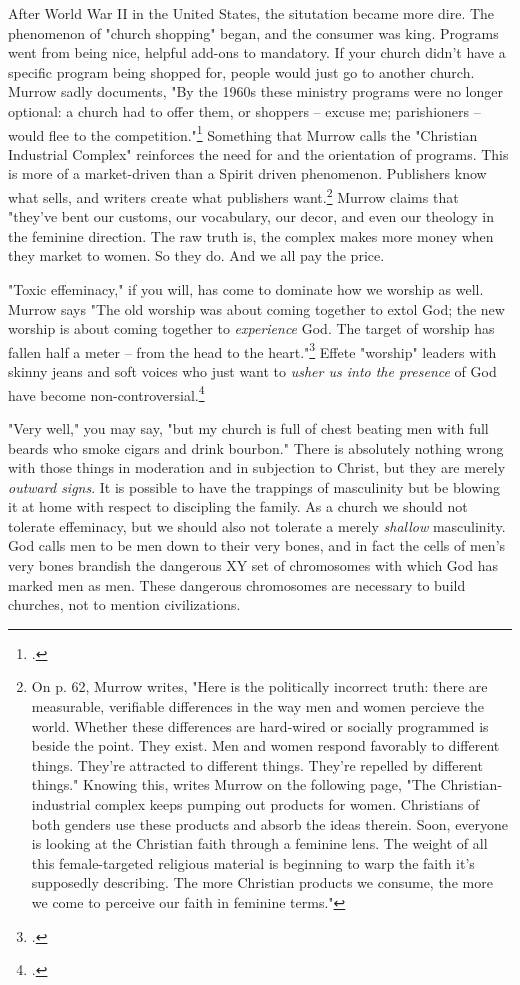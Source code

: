 After World War II in the United States, the situtation became more dire.  The phenomenon of "church shopping" began, and the consumer was king.  Programs went from being nice, helpful add-ons to mandatory.  If your church didn't have a specific program being shopped for, people would just go to another church.  Murrow sadly documents, "By the 1960s these ministry programs were no longer optional: a church had to offer them, or shoppers -- excuse me; parishioners -- would flee to the competition."\footcite[p. 60]{murrowmen} Something that Murrow calls the "Christian Industrial Complex" reinforces the need for and the orientation of programs.  This is more of a market-driven than a Spirit driven phenomenon.  Publishers know what sells, and writers create what publishers want.\footnote{On p. 62, Murrow writes, "Here is the politically incorrect truth: there are measurable, verifiable differences in the way men and women percieve the world.  Whether these differences are hard-wired or socially programmed is beside the point.  They exist.  Men and women respond favorably to different things.  They're attracted to different things.  They're repelled by different things."  Knowing this, writes Murrow on the following page, "The Christian-industrial complex keeps pumping out products for women.  Christians of both genders use these products and absorb the ideas therein.  Soon, everyone is looking at the Christian faith through a feminine lens.  The weight of all this female-targeted religious material is beginning to warp the faith it's supposedly describing.  The more Christian products we consume, the more we come to perceive our faith in feminine terms."}  Murrow claims that "they've bent our customs, our vocabulary, our decor, and even our theology in the feminine direction.  The raw truth is, the complex makes more money when they market to women.  So they do.  And we all pay the price.

"Toxic effeminacy," if you will, has come to dominate how we worship as well.  Murrow says "The old worship was about coming together to extol God; the new worship is about coming together to \textit{experience} God.  The target of worship has fallen half a meter -- from the head to the heart."\footcite[p. 70]{murrowmen} Effete "worship" leaders with skinny jeans and soft voices who just want to \textit{usher us into the presence} of God have become non-controversial.\footcite[p. 76]{murrowmen}

"Very well," you may say, "but my church is full of chest beating men with full beards who smoke cigars and drink bourbon."  There is absolutely nothing wrong with those things in moderation and in subjection to Christ, but they are merely \textit{outward signs}.  It is possible to have the trappings of masculinity but be blowing it at home with respect to discipling the family.  As a church we should not tolerate effeminacy, but we should also not tolerate a merely \textit{shallow} masculinity.  God calls men to be men down to their very bones, and in fact the cells of men's very bones brandish the dangerous XY set of chromosomes with which God has marked men as men.  These dangerous chromosomes are necessary to build churches, not to mention civilizations.

